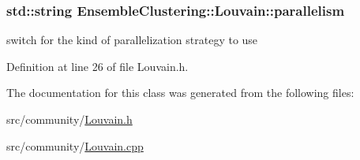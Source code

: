 \hypertarget{class_ensemble_clustering_1_1_louvain_aef8ac84e212816b649e3a3f463741228}{
\subsubsection[{parallelism}]{\setlength{\rightskip}{0pt plus 5cm}std\-::string Ensemble\-Clustering\-::\-Louvain\-::parallelism\hspace{0.3cm}{\ttfamily [protected]}}}\label{class_ensemble_clustering_1_1_louvain_aef8ac84e212816b649e3a3f463741228}


switch for the kind of parallelization strategy to use 



Definition at line 26 of file Louvain.\-h.



The documentation for this class was generated from the following files\-:\begin{DoxyCompactItemize}
\item 
src/community/\hyperlink{_louvain_8h}{Louvain.\-h}\item 
src/community/\hyperlink{_louvain_8cpp}{Louvain.\-cpp}\end{DoxyCompactItemize}
